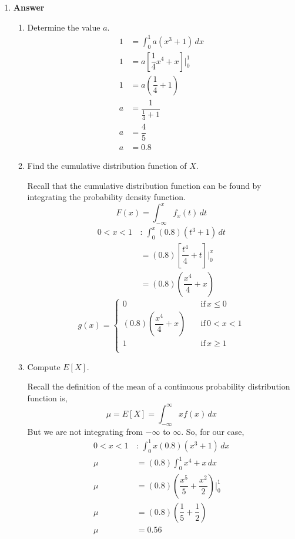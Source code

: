 \documentclass[12pt]{book}
\begin{document}
\begin{enumerate}
    \newpage
    \item \textbf{Answer}
    
    \begin{enumerate}
        \item Determine the value $a$.
        \begin{align*}
            1 &= \int_{0}^{1} a(x^3+1) \,dx \\
            1 &= a \left[\dfrac{1}{4}x^4 + x\right] \Big|_0^1 \\
            1 &= a \left(\dfrac{1}{4} + 1\right) \\
            a &= \dfrac{1}{\frac{1}{4} + 1} \\
            a &= \dfrac{4}{5} \\
            a &= 0.8
        \end{align*}
        
        \item Find the cumulative distribution function of $X$.
        
        Recall that the cumulative distribution function can be found by integrating the probability density function.
        $$F(x) = \int_{-\infty}^{x} f_x(t) \, dt$$
        \begin{align*}
            0 < x < 1 \, &: \, \int_{0}^{x} (0.8)(t^3+1) \, dt\\
            &= (0.8) \left[\dfrac{t^4}{4} + t\right] \Big|_{0}^{x}\\
            &= (0.8) \left(\dfrac{x^4}{4}+x\right)
        \end{align*}
        \begin{equation*}
            g(x)=
            \begin{cases}
                0 \quad &\text{if} \, x \leq 0 \\
                (0.8) \left(\dfrac{x^4}{4}+x\right) \quad &\text{if} \, 0 < x < 1 \\
                1 \quad &\text{if} \, x \geq 1 \\
            \end{cases}
        \end{equation*}
        
        \item Compute $E[X]$.
        
        Recall the definition of the mean of a continuous probability distribution function is,
        $$\mu = E[X] = \int_{-\infty}^{\infty} xf(x) \, dx$$
        But we are not integrating from $-\infty$ to $\infty$. So, for our case,
        \begin{align*}
            0 < x < 1 \, &: \, \int_{0}^{1} x (0.8) \left(x^3+1\right) \, dx\\
            \mu &= (0.8) \int_{0}^{1} x^4 + x \, dx \\
            \mu &= (0.8) \left(\dfrac{x^5}{5} + \dfrac{x^2}{2}\right) \Big|_{0}^{1}\\
            \mu &= (0.8) \left(\dfrac{1}{5} + \dfrac{1}{2}\right)\\
            \mu &= 0.56
        \end{align*}
        

\end{enumerate}
\end{enumerate}
\end{document}
